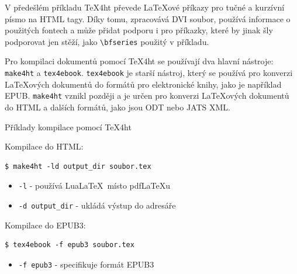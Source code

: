 V předešlém příkladu \TeX4ht převede LaTeXové příkazy pro tučné a kurzívní písmo na HTML tagy.
Díky tomu, zpracovává DVI soubor, používá informace o použitých fontech a může 
přidat podporu i pro příkazky, které by jinak šly podporovat jen stěží, jako 
\verb|\bfseries| použitý v příkladu.


Pro kompilaci dokumentů pomocí \TeX4ht se používají dva hlavní nástroje: \texttt{make4ht} a \texttt{tex4ebook}.
\texttt{tex4ebook} je starší nástroj, který se používá pro konverzi LaTeXových
dokumentů do formátů pro elektronické knihy, jako je například EPUB.
\texttt{make4ht} vznikl později a je určen pro konverzi LaTeXových dokumentů do
HTML a dalších formátů, jako jsou ODT nebo JATS XML.

\begin{frame}[fragile]{Příklady kompilace pomocí TeX4ht}

\begin{block}{Kompilace do HTML:}
\begin{verbatim}
$ make4ht -ld output_dir soubor.tex
\end{verbatim}
\end{block}



\begin{itemize}
    \item \texttt{-l} - používá Lua\LaTeX\ místo pdf\LaTeX u
    \item \texttt{-d output\_dir} - ukládá výstup do adresáře
\end{itemize}

\begin{block}{Kompilace do EPUB3:}
\begin{verbatim}
$ tex4ebook -f epub3 soubor.tex
\end{verbatim}
\end{block}

\begin{itemize}
    \item \texttt{-f epub3} - specifikuje formát EPUB3
\end{itemize}
\end{frame}

